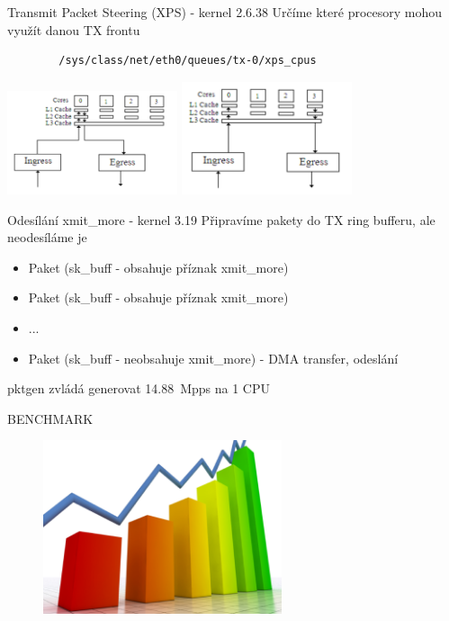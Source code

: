 \documentclass{beamer}
\begin{document}
\begin{frame}[fragile]{Transmit Packet Steering (XPS) - kernel 2.6.38}
	Určíme které procesory mohou využít danou TX frontu
	\begin{lstlisting}
		/sys/class/net/eth0/queues/tx-0/xps_cpus
	\end{lstlisting}

	\includegraphics[width=5cm,keepaspectratio]{fig/irq-cache.png}
	\includegraphics[width=5cm,keepaspectratio]{fig/irq-spread.png}
\end{frame}

\begin{frame}{Odesílání xmit\_more - kernel 3.19}
	Připravíme pakety do TX ring bufferu, ale neodesíláme je
	\begin{itemize}
		\item Paket (sk\_buff - obsahuje příznak xmit\_more)
		\item Paket (sk\_buff - obsahuje příznak xmit\_more)
		\item ...
		\item Paket (sk\_buff - neobsahuje xmit\_more) - DMA transfer, odeslání
	\end{itemize}
	pktgen zvládá generovat 14.88~Mpps na 1 CPU
\end{frame}


\begin{frame}{BENCHMARK}
		\begin{figure}
			\centering
			\includegraphics[width=7cm,keepaspectratio]{fig/bench.png}
		\end{figure}
\end{frame}
\end{document}
